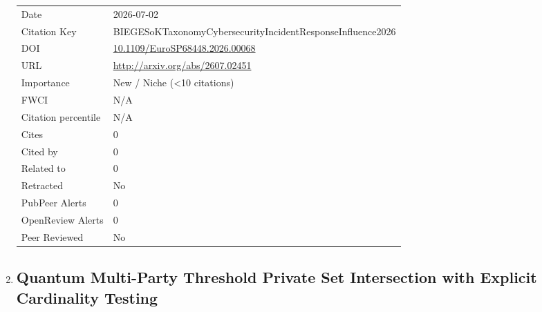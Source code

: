 \documentclass{article}
\begin{document}
\begin{enumerate}[label=\arabic*., font=\Large]
\begin{longtable}{p{} p{\contentcolwidth-2\tabcolsep}}
Date & 2026-07-02 \\
Citation Key & BIEGESoKTaxonomyCybersecurityIncidentResponseInfluence2026 \\
DOI & \href{http://doi.org/10.1109/EuroSP68448.2026.00068}{10.1109/EuroSP68448.2026.00068} \\
URL & \url{http://arxiv.org/abs/2607.02451} \\
Importance & New / Niche (<10 citations) \\
FWCI & N/A \\
Citation percentile & N/A \\
Cites & 0 \\
Cited by & 0 \\
Related to & 0 \\
Retracted & No \\
PubPeer Alerts & 0 \\
OpenReview Alerts & 0 \\
Peer Reviewed & No \\
\bottomrule
\end{longtable}

\item
{}\label{quantum-multi-party-threshold-private-set-intersection-with-explicit-cardinality-testing}
\hypertarget{item_GONGQuantumMultiPartyThresholdPrivateSetIntersection2026}{}
\subsection*{Quantum Multi-Party Threshold Private Set Intersection with Explicit Cardinality Testing}


\end{enumerate}
\end{document}
